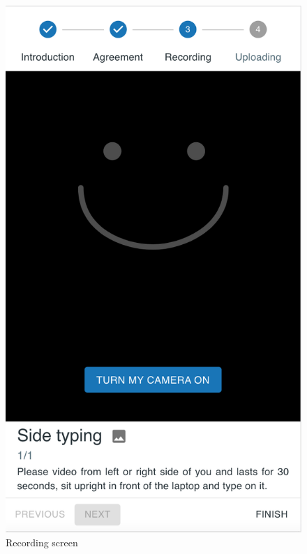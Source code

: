 \begin{minipage}{.5\textwidth}
\begin{figure}[H]
    \centering
    \includegraphics[width=\textwidth]{appendix/imgs/web-record.png}
    \caption{Recording screen}
    \label{fig:web-record}
\end{figure}
\end{minipage}

